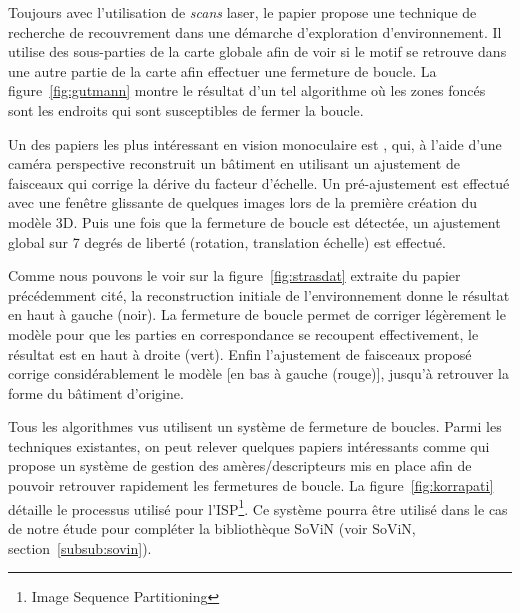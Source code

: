 Toujours avec l'utilisation de \emph{scans} laser, le papier \cite{Gutmann99} propose une technique de recherche de recouvrement dans une démarche d'exploration d'environnement. 
Il utilise des sous-parties de la carte globale afin de voir si le motif se retrouve dans une autre partie de la carte afin effectuer une fermeture de boucle.
La figure~\ref{fig:gutmann} montre le résultat d'un tel algorithme où les zones foncés sont les endroits qui sont susceptibles de fermer la boucle. 

Un des papiers les plus intéressant en vision monoculaire est \cite{Strasdat10}, qui, à l'aide d'une caméra perspective reconstruit un bâtiment en utilisant un ajustement de faisceaux qui corrige la dérive du facteur d'échelle.
Un pré-ajustement est effectué avec une fenêtre glissante de quelques images lors de la première création du modèle 3D.
Puis une fois que la fermeture de boucle est détectée, un ajustement global sur 7 degrés de liberté (rotation, translation échelle) est effectué.

Comme nous pouvons le voir sur la figure~\ref{fig:strasdat} extraite du papier précédemment cité, la reconstruction initiale de l'environnement donne le résultat en haut à gauche (noir).
La fermeture de boucle permet de corriger légèrement le modèle pour que les parties en correspondance se recoupent effectivement, le résultat est en haut à droite (vert).
Enfin l'ajustement de faisceaux proposé corrige considérablement le modèle [en bas à gauche (rouge)], jusqu'à retrouver la forme du bâtiment d'origine.

\vspace{5mm}
Tous les algorithmes vus utilisent un système de fermeture de boucles.
Parmi les techniques existantes, on peut relever quelques papiers intéressants comme \cite{Korrapati11} qui propose un système de gestion des amères/descripteurs mis en place afin de pouvoir retrouver rapidement les fermetures de boucle.
La figure~\ref{fig:korrapati} détaille le processus utilisé pour l'ISP\footnote{Image Sequence Partitioning}.
Ce système pourra être utilisé dans le cas de notre étude pour compléter la bibliothèque SoViN (voir SoViN, section~\ref{subsub:sovin}).



